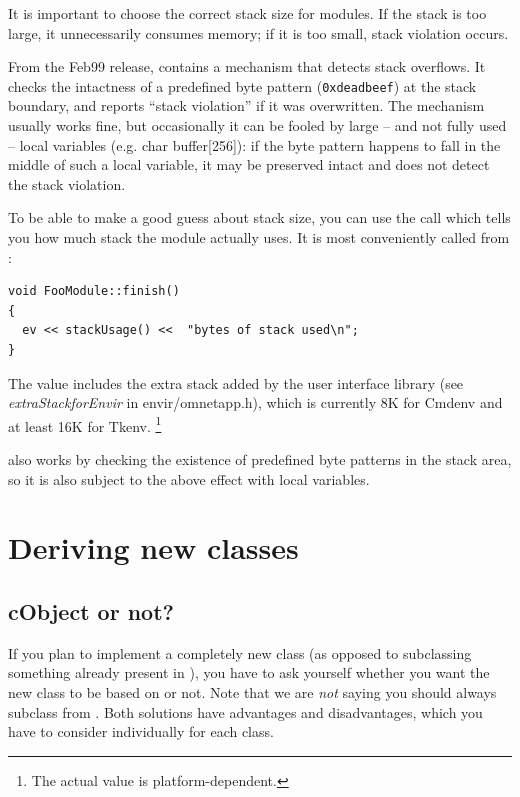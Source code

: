 It is important to choose the correct stack size for
modules.  If the stack is
too large, it unnecessarily consumes memory; if it is too small, stack
violation occurs.

From the Feb99 release, {\opp} contains a mechanism that detects stack
overflows. It checks the intactness of a
predefined byte pattern (\texttt{0xdeadbeef}) at the stack boundary,
and reports ``stack violation'' if it was
overwritten. The mechanism usually works fine, but occasionally it can
be fooled by large -- and not fully used -- local variables (e.g. char
buffer[256]): if the byte pattern happens to fall in the middle of
such a local variable, it may be preserved intact and {\opp} does not
detect the stack violation.

To be able to make a good guess about stack size, you can use
the  call which tells you how much stack the module
actually uses. It is most conveniently called from :

\begin{verbatim}
void FooModule::finish()
{
  ev << stackUsage() <<  "bytes of stack used\n";
}
\end{verbatim}


The value includes the extra stack added by the user interface library
(see \textit{extraStackforEnvir} in
envir/omnetapp.h), which is currently 8K for Cmdenv and at least 16K
for Tkenv.
  \footnote{The actual value is platform-dependent.}

also works by checking the existence of predefined
byte patterns in the stack area, so it is also subject to the above
effect with local variables.



\section{Deriving new classes}
\label{sec:ch-sim-lib:deriving-new-classes}

\subsection{cObject or not?}

If you plan to implement a completely new class (as opposed to
subclassing something already present in {\opp}), you have
to ask yourself whether you want the new class to be based
on  or not.
Note that we are \textit{not} saying you should always
subclass from .
Both solutions have advantages and disadvantages, which you
have to consider individually for each class.

